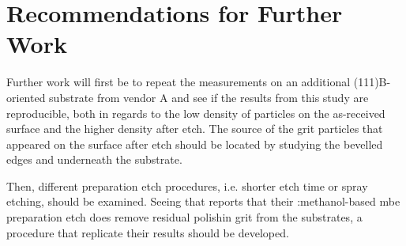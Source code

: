 \chapter{Recommendations for Further Work}\label{ch:further-work}
%

Further work will first be to repeat the measurements on an additional (111)B-oriented substrate from vendor A and see if the results from this study are reproducible, both in regards to the low density of particles on the as-received surface and the higher density after etch. The source of the grit particles that appeared on the surface after etch should be located by studying the bevelled edges and underneath the substrate. 

Then, different preparation etch procedures, i.e. shorter etch time or spray etching, should be examined. Seeing that \citet{benson2016analysis} reports that their :methanol-based \ac{mbe} preparation etch does remove residual  polishin grit from the substrates, a procedure that replicate their results should be developed.


%

